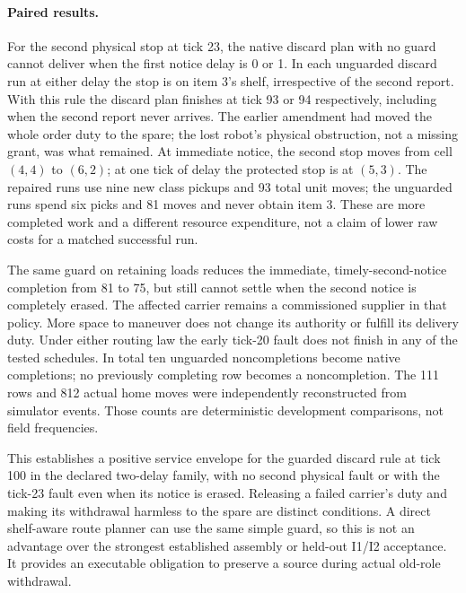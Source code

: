 \documentclass[11pt]{article}
\begin{document}
\paragraph{Paired results.}
For the second physical stop at tick 23, the native discard plan with no guard cannot deliver when the first notice delay is 0 or 1. In each unguarded discard run at either delay the stop is on item 3's shelf, irrespective of the second report. With this rule the discard plan finishes at tick 93 or 94 respectively, including when the second report never arrives. The earlier amendment had moved the whole order duty to the spare; the lost robot's physical obstruction, not a missing grant, was what remained. At immediate notice, the second stop moves from cell $(4,4)$ to $(6,2)$; at one tick of delay the protected stop is at $(5,3)$. The repaired runs use nine new class pickups and 93 total unit moves; the unguarded runs spend six picks and 81 moves and never obtain item 3. These are more completed work and a different resource expenditure, not a claim of lower raw costs for a matched successful run.

The same guard on retaining loads reduces the immediate, timely-second-notice completion from 81 to 75, but still cannot settle when the second notice is completely erased. The affected carrier remains a commissioned supplier in that policy. More space to maneuver does not change its authority or fulfill its delivery duty. Under either routing law the early tick-20 fault does not finish in any of the tested schedules. In total ten unguarded noncompletions become native completions; no previously completing row becomes a noncompletion. The 111 rows and 812 actual home moves were independently reconstructed from simulator events. Those counts are deterministic development comparisons, not field frequencies.

This establishes a positive service envelope for the guarded discard rule at tick 100 in the declared two-delay family, with no second physical fault or with the tick-23 fault even when its notice is erased. Releasing a failed carrier's duty and making its withdrawal harmless to the spare are distinct conditions. A direct shelf-aware route planner can use the same simple guard, so this is not an advantage over the strongest established assembly or held-out I1/I2 acceptance. It provides an executable obligation to preserve a source during actual old-role withdrawal.
\end{document}
